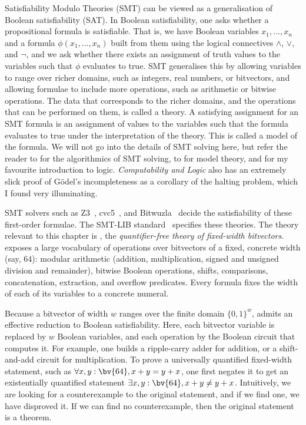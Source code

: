 Satisfiability Modulo Theories (SMT) can be viewed as a generalisation of Boolean satisfiability (SAT).
In Boolean satisfiability, one asks whether a propositional formula is satisfiable.
That is, we have Boolean variables $x_1, \dots, x_n$ and a formula $\phi(x_1, \dots, x_n)$ built from them using the logical connectives $\land$, $\lor$, and $\lnot$,
and we ask whether there exists an assignment of truth values to the variables such that $\phi$ evaluates to true.
SMT generalises this by allowing variables to range over richer domains,
such as integers, real numbers, or bitvectors, and allowing formulae to include more operations, such as arithmetic or bitwise operations.
The data that corresponds to the richer domains, and the operations that can be performed on them, is called a theory.
A satisfying assignment for an SMT formula is an assignment of values to the variables such that the formula evaluates to true under the interpretation of the theory.
This is called a model of the formula. We will not go into the details of SMT solving here,
but refer the reader to \citet{kroening2016decision} for the algorithmics of SMT solving,
to \citet{hodges1997shorter} for model theory, and \citet{boolos2002computability} for my favourite introduction to logic.
\emph{Computability and Logic} also has an extremely slick proof of G\"odel's incompleteness as a corollary
of the halting problem, which I found very illuminating.

SMT solvers such as Z3~\citep{de2008z3},
cvc5~\citep{barrett2011cvc4,barbosa2022cvc5}, and Bitwuzla~\citep{niemetz2023bitwuzla}
decide the satisfiability of these first-order formulae. The SMT-LIB standard~\citep{barrett2010smt,smtlib}
specifies these theories. The theory relevant to this chapter is \qfbv{}, the
\emph{quantifier-free theory of fixed-width bitvectors}. \qfbv{} exposes a
large vocabulary of operations over bitvectors of a fixed, concrete width (say, $64$):
modular arithmetic (addition, multiplication, signed and unsigned division and
remainder), bitwise Boolean operations, shifts, comparisons, concatenation, extraction, and overflow predicates.
Every \qfbv{} formula fixes the width of each of its variables to a concrete numeral.

Because a bitvector of width $w$ ranges over the finite domain $\{0,1\}^w$,
\qfbv{} admits an effective reduction to Boolean satisfiability.
Here, each bitvector variable is replaced by $w$ Boolean variables,
and each operation by the Boolean circuit that computes it.
For example, one builds a ripple-carry adder for addition,
or a shift-and-add circuit for multiplication.
To prove a universally quantified fixed-width statement, such as $\forall x, y : \bv{64}, x + y = y + x$,
one first negates it to get an existentially quantified statement $\exists x, y : \bv{64}, x + y \neq y + x$.
Intuitively, we are looking for a counterexample to the original statement, and if we find one, we have disproved it.
If we can find no counterexample, then the original statement is a theorem.

